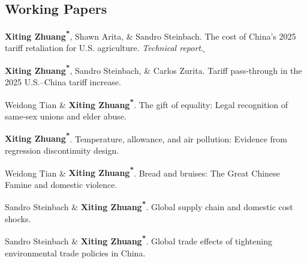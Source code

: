 \documentclass[10.8 pt,letterpaper]{article}
\newcommand{\corrauthor}{\textsuperscript{*}}
\newcommand{\paperlink}[1]{\href{#1}{\,\small\faExternalLink}}
\renewenvironment{itemize}{
	\begin{list}{}{
			\setlength{\leftmargin}{1.5em}
		}
	}{
	\end{list}
}
\begin{document}
	\subsection*{\textbf{Working Papers}}
	\begin{itemize}

 		\item[-] \textbf{Xiting Zhuang\corrauthor}, Shawn Arita, \& Sandro Steinbach. The cost of China's 2025 tariff retaliation for U.S. agriculture. \emph{Technical report}.\paperlink{https://www.capts-ndsu.com/_files/ugd/3c6228_53782e43f30d40c4b092b47016cab3c2.pdf}

 		\item[-] \textbf{Xiting Zhuang\corrauthor}, Sandro Steinbach, \& Carlos Zurita. Tariff pass-through in the 2025 U.S.--China tariff increase.
 
 
		\item[-] Weidong Tian \& \textbf{Xiting Zhuang\corrauthor}. The gift of equality: Legal recognition of same-sex unions and elder abuse.  
		
 
		
		\item[-] \textbf{Xiting Zhuang\corrauthor}. Temperature, allowance, and air pollution: Evidence from regression discontinuity design.
		
		\item[-] Weidong Tian \& \textbf{Xiting Zhuang\corrauthor}. Bread and bruises: The Great Chinese Famine and domestic violence.
		
		\item[-] Sandro Steinbach \& \textbf{Xiting Zhuang\corrauthor}. Global supply chain and domestic cost shocks.
		
		\item[-] Sandro Steinbach \& \textbf{Xiting Zhuang\corrauthor}. Global trade effects of tightening environmental trade policies in China.
	\end{itemize}
	
	
\end{document}
